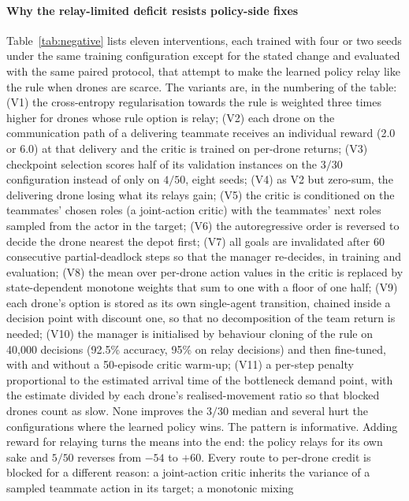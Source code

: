 \documentclass[final,5p,times,twocolumn]{elsarticle}
\begin{document}
\paragraph{Why the relay-limited deficit resists policy-side fixes}
\label{sec:negative}
Table~\ref{tab:negative} lists eleven interventions, each trained with four or two seeds under
the same training configuration except for the stated change and evaluated with the same paired protocol, that
attempt to make the learned policy relay like the rule when drones are scarce. The variants
are, in the numbering of the table: (V1) the cross-entropy regularisation towards the rule is
weighted three times higher for drones whose rule option is relay; (V2) each drone on the
communication path of a delivering teammate receives an individual reward (2.0 or 6.0) at that
delivery and the critic is trained on per-drone returns; (V3) checkpoint selection scores half of
its validation instances on the $3/30$ configuration instead of only on $4/50$, eight seeds; (V4) as
V2 but zero-sum, the delivering drone losing what its relays gain; (V5) the critic is conditioned
on the teammates' chosen roles (a joint-action critic) with the teammates' next roles sampled
from the actor in the target; (V6) the autoregressive order is reversed to decide the drone
nearest the depot first; (V7) all goals are invalidated after 60 consecutive partial-deadlock
steps so that the manager re-decides, in training and evaluation; (V8) the mean over per-drone
action values in the critic is replaced by state-dependent monotone weights that sum to one with
a floor of one half; (V9) each drone's option is stored as its own single-agent transition,
chained inside a decision point with discount one, so that no decomposition of the team return is
needed; (V10) the manager is initialised by behaviour cloning of the rule on 40{,}000
decisions (92.5\% accuracy, 95\% on relay decisions) and then fine-tuned, with and without a
50-episode critic warm-up; (V11) a per-step penalty proportional to the estimated arrival time of
the bottleneck demand point, with the estimate divided by each drone's realised-movement ratio so
that blocked drones count as slow. None improves the $3/30$ median and several hurt the
configurations where the learned policy wins. The pattern is informative. Adding reward for
relaying turns the means into the end: the policy relays for its own sake and $5/50$ reverses from
$-54$ to $+60$. Every route to per-drone credit is blocked for a different reason: a joint-action
critic inherits the variance of a sampled teammate action in its target; a monotonic mixing
\end{document}
